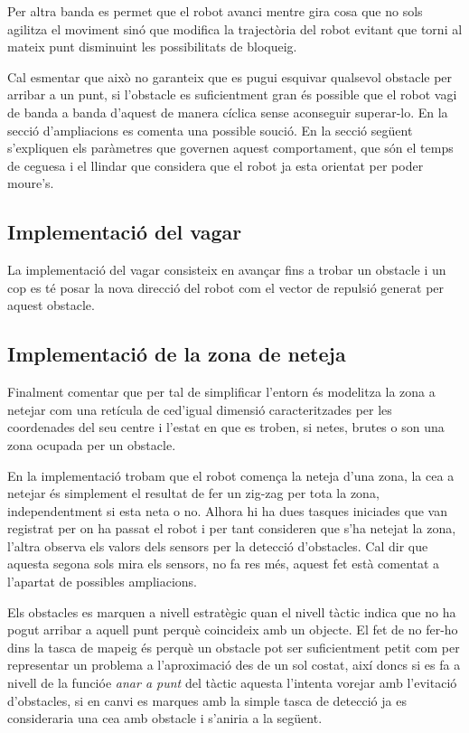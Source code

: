 Per altra banda es permet que el robot avanci mentre gira cosa que no sols agilitza el moviment sinó que
modifica la trajectòria del robot evitant que torni al mateix punt disminuint les possibilitats de bloqueig.

Cal esmentar que això no garanteix que es pugui esquivar qualsevol obstacle per arribar a un punt, 
si l'obstacle es suficientment gran és possible que el robot vagi de banda a banda d'aquest de manera
cíclica sense aconseguir superar-lo. En la secció d'ampliacions es comenta una possible so\lgem ució. En
la secció següent s'expliquen els paràmetres que governen aquest comportament, que són el temps
de ceguesa i el llindar que considera que el robot ja esta orientat per poder moure's.

\subsection{Implementació del vagar}

La implementació del vagar consisteix en avançar fins a trobar un obstacle i un cop es té posar 
la nova direcció del robot com el vector de repulsió generat per aquest obstacle.

\subsection{Implementació de la zona de neteja}

Finalment comentar que per tal de simplificar l'entorn és modelitza la zona a netejar com una retícula
de ce\lgem d'igual dimensió caracteritzades per les coordenades del seu centre i l'estat en que es troben,
si netes, brutes o son una zona ocupada per un obstacle.

En la implementació trobam que el robot comença la neteja d'una zona, la ce\lgem a a netejar és simplement
el resultat de fer un zig-zag per tota la zona, independentment si esta neta o no. Alhora hi ha dues tasques
iniciades que van registrat per on ha passat el robot i per tant consideren que s'ha netejat la zona, l'altra
observa els valors dels sensors per la detecció d'obstacles. Cal dir que aquesta segona sols mira els sensors,
no fa res més, aquest fet està comentat a l'apartat de possibles ampliacions.

Els obstacles es marquen a nivell estratègic quan el nivell tàctic indica que no ha pogut arribar a aquell
punt perquè coincideix amb un objecte. El fet de no fer-ho dins la tasca de mapeig és perquè un obstacle
pot ser suficientment petit com per representar un problema a l'aproximació des de un sol costat, així doncs
si es fa a nivell de la funcióe \emph{anar a punt} del tàctic aquesta l'intenta vorejar amb l'evitació d'obstacles, 
si en canvi es marques amb la simple tasca de detecció ja es consideraria una ce\lgem a amb obstacle i s'aniria a la següent.


